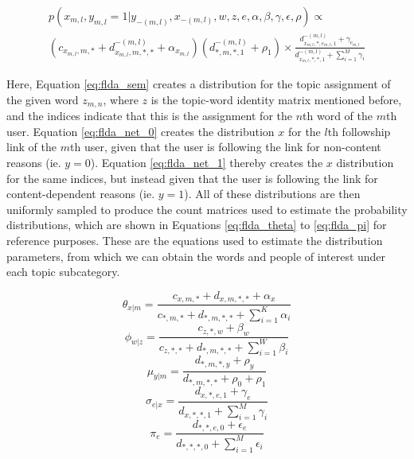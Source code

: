\documentclass[a4paper]{article}
\begin{document}
\begin{equation}\label{eq:flda_net_1}
  \begin{gathered}
    p(x_{m, l}, y_{m, l} = 1 | y_{-(m, l)}, x_{-(m, l)}, w, z, e, \alpha, \beta, \gamma, \epsilon, \rho) \propto \\
      (c_{x_{m, l}, m, *} + d_{x_{m, l}, m, *, *}^{-(m, l)} + \alpha_{x_{m, l}})(d_{*, m, *, 1}^{-(m, l)} + \rho_1) \times
      \frac{d_{x_{m, l}, *, e_{m, l}, 1}^{-(m, l)} + \gamma_{e_{m, l}}}
      {d_{x_{m, l}, *, *, 1}^{-(m, l)} + \sum^M_{i = 1}\gamma_i}
  \end{gathered}
\end{equation}

Here, Equation \ref{eq:flda_sem} creates a distribution for the topic assignment of the given word $z_{m, n}$, where $z$ is the topic-word identity matrix mentioned before, and the indices indicate that this is the assignment for the $n$th word of the $m$th user. Equation \ref{eq:flda_net_0} creates the distribution $x$ for the $l$th followship link of the $m$th user, given that the user is following the link for non-content reasons (ie. $y = 0$). Equation \ref{eq:flda_net_1} thereby creates the $x$ distribution for the same indices, but instead given that the user is following the link for content-dependent reasons (ie. $y = 1$). All of these distributions are then uniformly sampled to produce the count matrices used to estimate the probability distributions, which are shown in Equations \ref{eq:flda_theta} to \ref{eq:flda_pi} for reference purposes. These are the equations used to estimate the distribution parameters, from which we can obtain the words and people of interest under each topic subcategory.

\begin{equation}\label{eq:flda_theta}
  \theta_{x | m} = \frac{c_{x, m, *} + d_{x, m, *, *} + \alpha_x}{c_{*, m, *} + d_{*, m, *, *} + \sum_{i = 1}^K\alpha_i}
\end{equation}
\begin{equation}\label{eq:flda_phi}
  \phi_{w | z} = \frac{c_{z, *, w} + \beta_w}{c_{z, *, *} + d_{*, m, *, *} + \sum_{i = 1}^W\beta_i}
\end{equation}
\begin{equation}\label{eq:flda_mu}
  \mu_{y | m} = \frac{d_{*, m, *, y} + \rho_y}{d_{*, m, *, *} + \rho_0 + \rho_1}
\end{equation}
\begin{equation}\label{eq:flda_sigma}
  \sigma_{e | x} = \frac{d_{x, *, e, 1} + \gamma_e}{d_{x, *, *, 1} + \sum_{i = 1}^M\gamma_i}
\end{equation}
\begin{equation}\label{eq:flda_pi}
  \pi_{e} = \frac{d_{*, *, e, 0} + \epsilon_e}{d_{*, *, *, 0} + \sum_{i = 1}^M\epsilon_i}
\end{equation}
\end{document}
